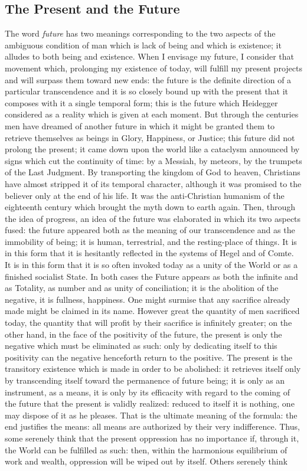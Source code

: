 \documentclass[11pt]{article}
\begin{document}
{{\subsection{The Present and the Future}
The word \textit{future} has two meanings corresponding to the two aspects of the ambiguous condition of man which is lack of being and which is existence; it alludes to both being and existence. When I envisage my future, I consider that movement which, prolonging my existence of today, will fulfill my present projects and will surpass them toward new ends: the future is the definite direction of a particular transcendence and it is so closely bound up with the present that it composes with it a single temporal form; this is the future which Heidegger considered as a reality which is given at each moment. But through the centuries men have dreamed of another future in which it might be granted them to retrieve themselves as beings in Glory, Happiness, or Justice; this future did not prolong the present; it came down upon the world like a cataclysm announced by signs which cut the continuity of time: by a Messiah, by meteors, by the trumpets of the Last Judgment. By transporting the kingdom of God to heaven, Christians have almost stripped it of its temporal character, although it was promised to the believer only at the end of his life. It was the anti-Christian humanism of the eighteenth century which brought the myth down to earth again. Then, through the idea of progress, an idea of the future was elaborated in which its two aspects fused: the future appeared both as the meaning of our transcendence and as the immobility of being; it is human, terrestrial, and the resting-place of things. It is in this form that it is hesitantly reflected in the systems of Hegel and of Comte. It is in this form that it is so often invoked today as a unity of the World or as a finished socialist State. In both cases the Future appears as both the infinite and as Totality, as number and as unity of conciliation; it is the abolition of the negative, it is fullness, happiness. One might surmise that any sacrifice already made might be claimed in its name. However great the quantity of men sacrificed today, the quantity that will profit by their sacrifice is infinitely greater; on the other hand, in the face of the positivity of the future, the present is only the negative which must be eliminated as such: only by dedicating itself to this positivity can the negative henceforth return to the positive. The present is the transitory existence which is made in order to be abolished: it retrieves itself only by transcending itself toward the permanence of future being; it is only as an instrument, as a means, it is only by its efficacity with regard to the coming of the future that the present is validly realized: reduced to itself it is nothing, one may dispose of it as he pleases. That is the ultimate meaning of the formula: the end justifies the means: all means are authorized by their very indifference. Thus, some serenely think that the present oppression has no importance if, through it, the World can be fulfilled as such: then, within the harmonious equilibrium of work and wealth, oppression will be wiped out by itself. Others serenely think }}
\end{document}
